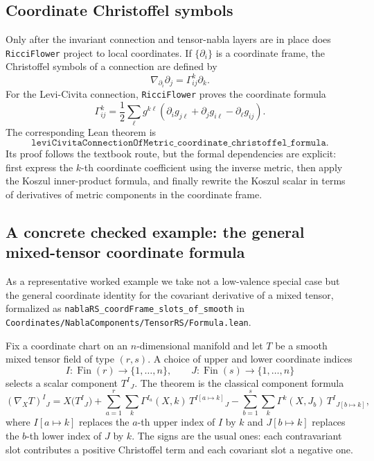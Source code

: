 \documentclass[11pt]{article}
\theoremstyle{plain}
\theoremstyle{definition}
\theoremstyle{remark}
\newcommand{\leanref}[1]{\nolinkurl{#1}}
\newcommand{\leanfile}[1]{\nolinkurl{#1}}
\newcommand{\rffile}[1]{\leanfile{#1}}
\begin{document}
\subsection{Coordinate Christoffel symbols}

Only after the invariant connection and tensor-nabla layers are in place does
\texttt{RicciFlower} project to local coordinates.  If $\{\partial_i\}$ is a
coordinate frame, the Christoffel symbols of a connection are defined by
\[
  \nabla_{\partial_i}\partial_j
  =
  \Gamma^k_{ij}\partial_k.
\]
For the Levi-Civita connection, \texttt{RicciFlower} proves the coordinate
formula
\[
  \Gamma^k_{ij}
  =
  \frac12
  \sum_\ell g^{k\ell}
  \left(
    \partial_i g_{j\ell}
    +
    \partial_j g_{i\ell}
    -
    \partial_\ell g_{ij}
  \right).
\]
The corresponding Lean theorem is
\[
  \texttt{leviCivitaConnectionOfMetric\_coordinate\_christoffel\_formula}.
\]
Its proof follows the textbook route, but the formal dependencies are explicit:
first express the $k$-th coordinate coefficient using the inverse metric, then
apply the Koszul inner-product formula, and finally rewrite the Koszul scalar in
terms of derivatives of metric components in the coordinate frame.

\subsection{A concrete checked example: the general mixed-tensor coordinate formula}

As a representative worked example we take not a low-valence special case but
the general coordinate identity for the covariant derivative of a mixed tensor,
formalized as \leanref{nablaRS_coordFrame_slots_of_smooth} in
\rffile{Coordinates/NablaComponents/TensorRS/Formula.lean}.

Fix a coordinate chart on an $n$-dimensional manifold and let $T$ be a smooth
mixed tensor field of type $(r,s)$.  A choice of upper and lower coordinate
indices
\[
  I : \operatorname{Fin}(r) \to \{1,\ldots,n\},
  \qquad
  J : \operatorname{Fin}(s) \to \{1,\ldots,n\}
\]
selects a scalar component $T^I{}_J$.  The theorem is the classical component
formula
\[
  (\nabla_X T)^I{}_J
  =
  X\bigl(T^I{}_J\bigr)
  +
  \sum_{a=1}^{r}\sum_{k}
  \Gamma^{I_a}(X,k)\,T^{I[a\mapsto k]}{}_J
  -
  \sum_{b=1}^{s}\sum_{k}
  \Gamma^k(X,J_b)\,T^I{}_{J[b\mapsto k]},
\]
where $I[a\mapsto k]$ replaces the $a$-th upper index of $I$ by $k$ and
$J[b\mapsto k]$ replaces the $b$-th lower index of $J$ by $k$.  The signs are the
usual ones: each contravariant slot contributes a positive Christoffel term and
each covariant slot a negative one.
\end{document}
